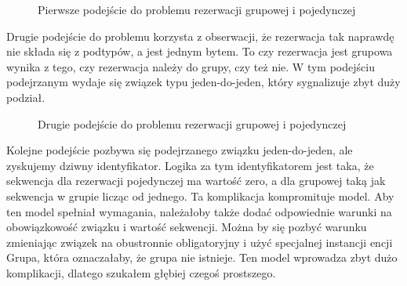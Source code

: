 \documentclass[a4paper,onecolumn,oneside,11pt,wide,floatssmall]{mwrep}
\theoremstyle{definition}
\theoremstyle{plain}%
\theoremstyle{remark}
\begin{document}
\begin{figure}[H]
  \begin{center}
  \end{center}
  \caption{Pierwsze podejście do problemu rezerwacji grupowej i pojedynczej}
  \label{fig:db-logical-model-group-reservation-first-try}
\end{figure}

Drugie podejście do problemu korzysta z obserwacji, że rezerwacja tak naprawdę nie składa się z podtypów, a jest jednym bytem. To czy rezerwacja jest grupowa wynika z tego, czy rezerwacja należy do grupy, czy też nie. W tym podejściu podejrzanym wydaje się związek typu jeden-do-jeden, który sygnalizuje zbyt duży podział. 

\begin{figure}[H]
  \begin{center}
  \end{center}
  \caption{Drugie podejście do problemu rezerwacji grupowej i pojedynczej}
  \label{fig:db-logical-model-group-reservation-second-try}
\end{figure}

Kolejne podejście pozbywa się podejrzanego związku jeden-do-jeden, ale zyskujemy dziwny identyfikator. Logika za tym identyfikatorem jest taka, że sekwencja dla rezerwacji pojedynczej ma wartość zero, a dla grupowej taką jak sekwencja w grupie licząc od jednego. Ta komplikacja kompromituje model. Aby ten model spełniał wymagania, należałoby także dodać odpowiednie warunki na obowiązkowość związku i wartość sekwencji. Można by się pozbyć warunku zmieniając związek na obustronnie obligatoryjny i użyć specjalnej instancji encji Grupa, która oznaczałaby, że grupa nie istnieje. Ten model wprowadza zbyt dużo komplikacji, dlatego szukałem głębiej czegoś prostszego.
\end{document}
